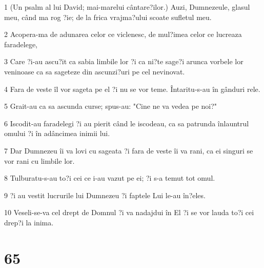 \par 1 (Un psalm al lui David; mai-marelui cântare?ilor.) Auzi, Dumnezeule, glasul meu, când ma rog ?ie; de la frica vrajma?ului scoate sufletul meu.
\par 2 Acopera-ma de adunarea celor ce viclenesc, de mul?imea celor ce lucreaza faradelege,
\par 3 Care ?i-au ascu?it ca sabia limbile lor ?i ca ni?te sage?i arunca vorbele lor veninoase ca sa sageteze din ascunzi?uri pe cel nevinovat.
\par 4 Fara de veste îl vor sageta pe el ?i nu se vor teme. Întaritu-s-au în gânduri rele.
\par 5 Grait-au ca sa ascunda curse; spus-au: "Cine ne va vedea pe noi?"
\par 6 Iscodit-au faradelegi ?i au pierit când le iscodeau, ca sa patrunda înlauntrul omului ?i în adâncimea inimii lui.
\par 7 Dar Dumnezeu îi va lovi cu sageata ?i fara de veste îi va rani, ca ei singuri se vor rani cu limbile lor.
\par 8 Tulburatu-s-au to?i cei ce i-au vazut pe ei; ?i s-a temut tot omul.
\par 9 ?i au vestit lucrurile lui Dumnezeu ?i faptele Lui le-au în?eles.
\par 10 Veseli-se-va cel drept de Domnul ?i va nadajdui în El ?i se vor lauda to?i cei drep?i la inima.

\chapter{65}

